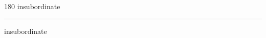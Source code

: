 
\begin{frame}
\begin{center}
\begin{turn}{180}
{\fontsize{2.5cm}{1em}\selectfont insubordinate}
\end{turn}
\vspace{1em}\par  
\hrule
\vspace{1em}\par  
{\fontsize{2.5cm}{1em}\selectfont insubordinate}
\end{center}
\end{frame}
